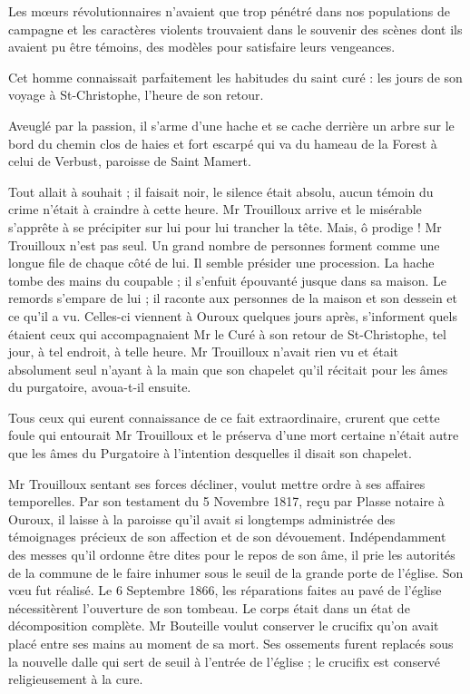 Les mœurs révolutionnaires n'avaient que trop pénétré dans nos populations de campagne et les caractères violents trouvaient dans le souvenir des scènes dont ils avaient pu être témoins, des modèles pour satisfaire leurs vengeances.

Cet homme connaissait parfaitement les habitudes du saint curé : les jours de son voyage à St-Christophe, l'heure de son retour.

Aveuglé par la passion, il s'arme d'une hache et se cache derrière un arbre sur le bord du chemin clos de haies et fort escarpé qui va du hameau de la Forest à celui de Verbust, paroisse de Saint Mamert.

Tout allait à souhait ; il faisait noir, le silence était absolu, aucun témoin du crime n'était à craindre à cette heure. Mr Trouilloux arrive et le misérable s'apprête à se précipiter sur lui pour lui trancher la tête. Mais, ô prodige ! Mr Trouilloux n'est pas seul. Un grand nombre de personnes forment comme une longue file de chaque côté de lui. Il semble présider une procession. La hache tombe des mains du coupable ; il s'enfuit épouvanté jusque dans sa maison. Le remords s'empare de lui ; il raconte aux personnes de la maison et son dessein et ce qu'il a vu. Celles-ci viennent à Ouroux quelques jours après, s'informent quels étaient ceux qui accompagnaient Mr le Curé à son retour de St-Christophe, tel jour, à tel endroit, à telle heure. Mr Trouilloux n'avait rien vu et était absolument seul n'ayant à la main que son chapelet qu'il récitait pour les âmes du purgatoire, avoua-t-il ensuite.

Tous ceux qui eurent connaissance de ce fait extraordinaire, crurent que cette foule qui entourait Mr Trouilloux et le préserva d'une mort certaine n'était autre que les âmes du Purgatoire à l'intention desquelles il disait son chapelet.

Mr Trouilloux sentant ses forces décliner, voulut mettre ordre
à ses affaires temporelles. Par son testament du 5 Novembre 1817, reçu par Plasse notaire à Ouroux, il laisse à la paroisse qu'il avait si longtemps administrée des témoignages précieux de son affection et de son dévouement. Indépendamment des messes qu'il ordonne être dites pour le repos de son âme, il prie les autorités de la commune de le faire inhumer sous le seuil de la grande porte de l'église. Son vœu fut réalisé. Le 6 Septembre 1866, les réparations faites au pavé de l'église nécessitèrent l'ouverture de son tombeau. Le corps était dans un état de décomposition complète. Mr Bouteille voulut conserver le crucifix qu'on avait placé entre ses mains au moment de sa mort. Ses ossements furent replacés sous la nouvelle dalle qui sert de seuil à l'entrée de l'église ; le crucifix est conservé religieusement à la cure.

